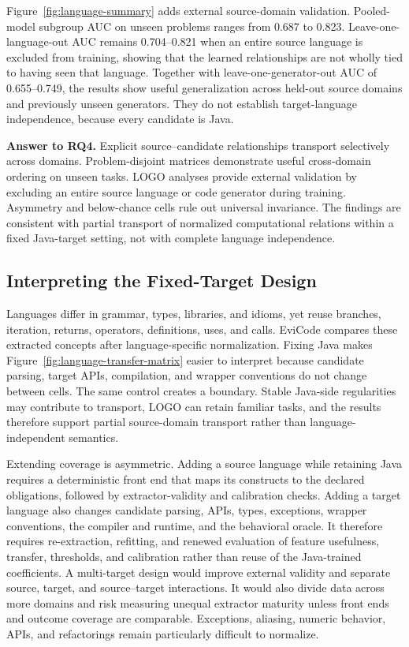 \documentclass[conference]{IEEEtran}
\begin{document}
Figure~\ref{fig:language-summary} adds external source-domain validation. Pooled-model subgroup AUC on unseen problems ranges from 0.687 to 0.823. Leave-one-language-out AUC remains 0.704--0.821 when an entire source language is excluded from training, showing that the learned relationships are not wholly tied to having seen that language. Together with leave-one-generator-out AUC of 0.655--0.749, the results show useful generalization across held-out source domains and previously unseen generators. They do not establish target-language independence, because every candidate is Java.

\textbf{Answer to RQ4.} Explicit source--candidate relationships transport selectively across domains. Problem-disjoint matrices demonstrate useful cross-domain ordering on unseen tasks. LOGO analyses provide external validation by excluding an entire source language or code generator during training. Asymmetry and below-chance cells rule out universal invariance. The findings are consistent with partial transport of normalized computational relations within a fixed Java-target setting, not with complete language independence.

\subsection{Interpreting the Fixed-Target Design}
Languages differ in grammar, types, libraries, and idioms, yet reuse branches, iteration, returns, operators, definitions, uses, and calls. EviCode compares these extracted concepts after language-specific normalization. Fixing Java makes Figure~\ref{fig:language-transfer-matrix} easier to interpret because candidate parsing, target APIs, compilation, and wrapper conventions do not change between cells. The same control creates a boundary. Stable Java-side regularities may contribute to transport, LOGO can retain familiar tasks, and the results therefore support partial source-domain transport rather than language-independent semantics.

Extending coverage is asymmetric. Adding a source language while retaining Java requires a deterministic front end that maps its constructs to the declared obligations, followed by extractor-validity and calibration checks. Adding a target language also changes candidate parsing, APIs, types, exceptions, wrapper conventions, the compiler and runtime, and the behavioral oracle. It therefore requires re-extraction, refitting, and renewed evaluation of feature usefulness, transfer, thresholds, and calibration rather than reuse of the Java-trained coefficients. A multi-target design would improve external validity and separate source, target, and source--target interactions. It would also divide data across more domains and risk measuring unequal extractor maturity unless front ends and outcome coverage are comparable. Exceptions, aliasing, numeric behavior, APIs, and refactorings remain particularly difficult to normalize.
\end{document}
